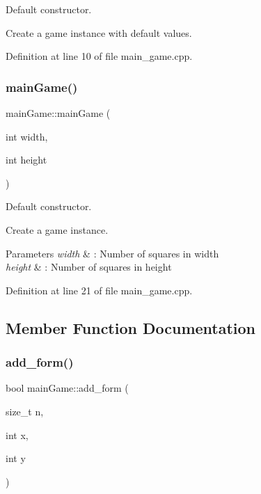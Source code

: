Default constructor. 

Create a game instance with default values. 

Definition at line 10 of file main\+\_\+game.\+cpp.

\hypertarget{classmain_game_a1a42050393a3a0f9aabfc898709b5438}{}\label{classmain_game_a1a42050393a3a0f9aabfc898709b5438} 
\subsubsection{\texorpdfstring{main\+Game()}{mainGame()}\hspace{0.1cm}{\footnotesize\ttfamily [2/2]}}
{\footnotesize\ttfamily main\+Game\+::main\+Game (\begin{DoxyParamCaption}\item[{int}]{width,  }\item[{int}]{height }\end{DoxyParamCaption})}



Default constructor. 

Create a game instance.


\begin{DoxyParams}{Parameters}
{\em width} & \+: Number of squares in width \\
\hline
{\em height} & \+: Number of squares in height \\
\hline
\end{DoxyParams}


Definition at line 21 of file main\+\_\+game.\+cpp.



\subsection{Member Function Documentation}
\hypertarget{classmain_game_a9dacdcdcaacc70edfb9483dfc7d561e7}{}\label{classmain_game_a9dacdcdcaacc70edfb9483dfc7d561e7} 
\subsubsection{\texorpdfstring{add\+\_\+form()}{add\_form()}}
{\footnotesize\ttfamily bool main\+Game\+::add\+\_\+form (\begin{DoxyParamCaption}\item[{size\+\_\+t}]{n,  }\item[{int}]{x,  }\item[{int}]{y }\end{DoxyParamCaption})}



